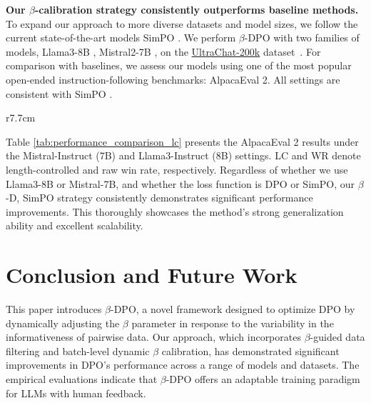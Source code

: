\textbf{Our $\beta$-calibration strategy consistently outperforms baseline methods.} To expand our approach to more diverse datasets and model sizes, we follow the current state-of-the-art models SimPO \cite{SimPO2024}. We perform $\beta$-DPO with two families of models, Llama3-8B \citep{llama3modelcard}, Mistral2-7B \citep{Jiang2023Mistral7}, on the \href{https://huggingface.co/datasets/HuggingFaceH4/ultrachat_200k}{UltraChat-200k} dataset~\cite{Ding2023EnhancingCL}. For comparison with baselines, we assess our models using one of the most popular open-ended instruction-following benchmarks: AlpacaEval 2. All settings are consistent with SimPO \cite{SimPO2024}.
\begin{wraptable}[11]{r}{7.7cm}
\centering
\vspace{-0.6em}
\caption{Performance comparison of different models}
 \small
{}
\label{tab:performance_comparison_lc}
\end{wraptable}
Table \ref{tab:performance_comparison_lc} presents the AlpacaEval 2 results under the Mistral-Instruct (7B) and Llama3-Instruct (8B) settings. LC and WR denote length-controlled and raw win rate, respectively. Regardless of whether we use Llama3-8B or Mistral-7B, and whether the loss function is DPO or SimPO, our $\beta$-{D, Sim}PO strategy consistently demonstrates significant performance improvements. This thoroughly showcases the method's strong generalization ability and excellent scalability.

\section{Conclusion and Future Work}
\label{conclusion}
This paper introduces $\beta$-DPO, a novel framework designed to optimize DPO by dynamically adjusting the $\beta$ parameter in response to the variability in the informativeness of pairwise data. Our approach, which incorporates $\beta$-guided data filtering and batch-level dynamic $\beta$ calibration, has demonstrated significant improvements in DPO's performance across a range of models and datasets. The empirical evaluations indicate that $\beta$-DPO offers an adaptable training paradigm for LLMs with human feedback.

